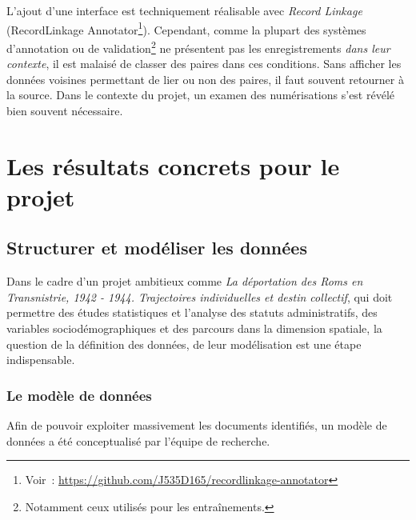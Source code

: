 \documentclass[a4paper,12pt,twoside]{book}
\begin{document}
                    L'ajout d'une interface est techniquement réalisable avec \textit{Record Linkage} (RecordLinkage Annotator\footnote{Voir~: \url{https://github.com/J535D165/recordlinkage-annotator}}). Cependant, comme la plupart des systèmes d'annotation ou de validation\footnote{Notamment ceux utilisés pour les entraînements.} ne présentent pas les enregistrements \textit{dans leur contexte}, il est malaisé de classer des paires dans ces conditions. Sans afficher les données voisines permettant de lier ou non des paires, il faut souvent retourner à la source. Dans le contexte du projet, un examen des numérisations s'est révélé bien souvent nécessaire.

		\section{Les résultats concrets pour le projet}
		
			\subsection{Structurer et modéliser les données}
			
			    Dans le cadre d'un projet ambitieux comme \textit{La déportation des Roms en Transnistrie, 1942 - 1944. Trajectoires individuelles et destin collectif}, qui doit permettre des études statistiques et l'analyse des statuts administratifs,  des variables sociodémographiques et des parcours dans la dimension spatiale, la question de la définition des données, de leur modélisation est une étape indispensable.
			
			    \subsubsection{Le modèle de données}
			    \label{modele}
			        Afin de pouvoir exploiter massivement les documents identifiés, un modèle de données a été conceptualisé par l'équipe de recherche.
			        
\end{document}
